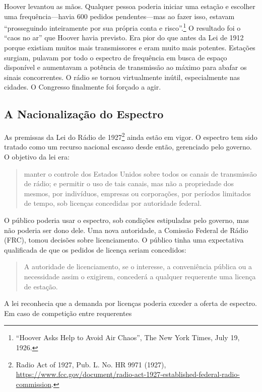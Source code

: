 \documentclass{book}
\begin{document}
Hoover levantou as mãos. Qualquer pessoa poderia iniciar uma estação e escolher
uma frequência---havia 600 pedidos pendentes---mas ao fazer isso, estavam
``prosseguindo inteiramente por sua própria conta e risco''.\footnote{``Hoover
Asks Help to Avoid Air Chaos'', The New York Times, July 19, 1926.} O resultado
foi o ``caos no ar'' que Hoover havia previsto. Era pior do que antes da Lei de
1912 porque existiam muitos mais transmissores e eram muito mais potentes.
Estações surgiam, pulavam por todo o espectro de frequência em busca de espaço
disponível e aumentavam a potência de transmissão ao máximo para abafar os sinais
concorrentes. O rádio se tornou virtualmente inútil, especialmente nas cidades.
O Congresso finalmente foi forçado a agir.

\subsection{A Nacionalização do Espectro}
\label{cap8:os-como-nacionalizacao}
As premissas da Lei do Rádio de 1927\footnote{Radio Act of 1927, Pub. L. No. HR
9971 (1927), \url{https://www.fcc.gov/document/radio-act-1927-established-federal-radio-commission}.}
ainda estão em vigor. O espectro tem sido tratado como um recurso nacional escasso
desde então, gerenciado pelo governo. O objetivo da lei era:

\begin{quote}
manter o controle dos Estados Unidos sobre todos os canais de transmissão de
rádio; e permitir o uso de tais canais, mas não a propriedade dos mesmos, por
indivíduos, empresas ou corporações, por períodos limitados de tempo, sob
licenças concedidas por autoridade federal.    
\end{quote}

O público poderia usar o espectro, sob condições estipuladas pelo governo, mas
não poderia ser dono dele. Uma nova autoridade, a Comissão Federal de Rádio (FRC),
tomou decisões sobre licenciamento. O público tinha uma expectativa qualificada
de que os pedidos de licença seriam concedidos:

\begin{quote}
    A autoridade de licenciamento, se o interesse, a conveniência pública ou a
    necessidade assim o exigirem, concederá a qualquer requerente uma licença de
    estação.    
\end{quote}

A lei reconhecia que a demanda por licenças poderia exceder a oferta de espectro.
Em caso de competição entre requerentes
\end{document}
